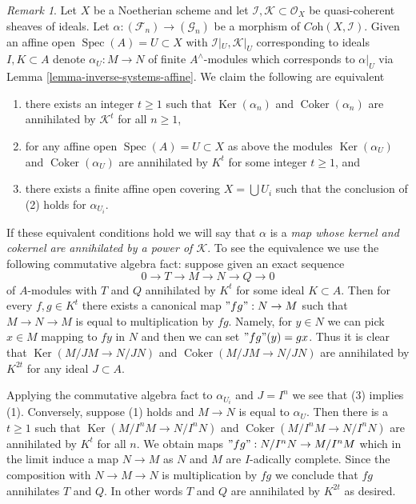 \documentclass[10pt,a4paper]{amsart}
\theoremstyle{plain}
\theoremstyle{definition}
\theoremstyle{remark}
\newtheorem{remark}[subsection]{Remark}
\numberwithin{equation}{subsection}
\def\Spec{\mathop{\mathrm{Spec}}}
\def\Ker{\mathop{\mathrm{Ker}}}
\def\Coker{\mathop{\mathrm{Coker}}}
\begin{document}
\begin{remark}
\label{remark-inverse-systems-kernel-cokernel-annihilated-by}
Let $X$ be a Noetherian scheme and let
$\mathcal{I}, \mathcal{K} \subset \mathcal{O}_X$
be quasi-coherent sheaves of ideals. Let
$\alpha : (\mathcal{F}_n) \to (\mathcal{G}_n)$ be a morphism of
$\textit{Coh}(X, \mathcal{I})$.
Given an affine open $\Spec(A) = U \subset X$ with
$\mathcal{I}|_U, \mathcal{K}|_U$ corresponding to ideals $I, K \subset A$
denote $\alpha_U : M \to N$ of finite $A^\wedge$-modules which
corresponds to $\alpha|_U$ via Lemma \ref{lemma-inverse-systems-affine}.
We claim the following are equivalent
\begin{enumerate}
\item there exists an integer $t \geq 1$ such that
$\Ker(\alpha_n)$ and $\Coker(\alpha_n)$
are annihilated by $\mathcal{K}^t$ for all $n \geq 1$,
\item for any affine open $\Spec(A) = U \subset X$ as above
the modules $\Ker(\alpha_U)$ and $\Coker(\alpha_U)$
are annihilated by $K^t$ for some integer $t \geq 1$, and
\item there exists a finite affine open covering $X = \bigcup U_i$
such that the conclusion of (2) holds for $\alpha_{U_i}$.
\end{enumerate}
If these equivalent conditions hold we will say that
$\alpha$ is a
{\it map whose kernel and cokernel are annihilated by a power of
$\mathcal{K}$}.
To see the equivalence we use the following commutative algebra fact:
suppose given an exact sequence
$$
0 \to T \to M \to N \to Q \to 0
$$
of $A$-modules with $T$ and $Q$ annihilated by $K^t$ for some
ideal $K \subset A$. Then for every $f, g \in K^t$ there exists a
canonical map $"fg": N \to M$ such that $M \to N \to M$ is equal to
multiplication by $fg$. Namely, for $y \in N$ we can pick $x \in M$
mapping to $fy$ in $N$ and then we can set $"fg"(y) = gx$. Thus it is
clear that $\Ker(M/JM \to N/JN)$ and $\Coker(M/JM \to N/JN)$
are annihilated by $K^{2t}$ for any ideal $J \subset A$.

\medskip\noindent
Applying the commutative algebra fact to $\alpha_{U_i}$ and $J = I^n$
we see that (3) implies (1). Conversely,
suppose (1) holds and $M \to N$ is equal to $\alpha_U$. Then there is
a $t \geq 1$ such that
$\Ker(M/I^nM \to N/I^nN)$ and $\Coker(M/I^nM \to N/I^nN)$
are annihilated by $K^t$ for all $n$. We obtain maps
$"fg" : N/I^nN \to M/I^nM$ which in the limit induce a map $N \to M$
as $N$ and $M$ are $I$-adically complete. Since the composition with
$N \to M \to N$ is multiplication by $fg$ we conclude that $fg$
annihilates $T$ and $Q$. In other words $T$ and $Q$ are annihilated by
$K^{2t}$ as desired.
\end{remark}
\end{document}
